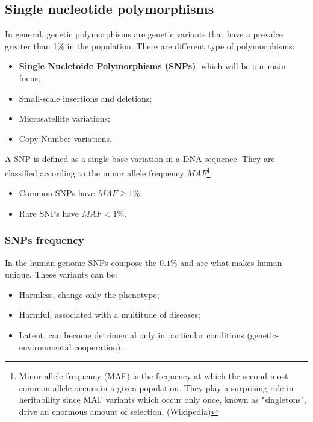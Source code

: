 	\subsection{Single nucleotide polymorphisms}
	In general, genetic polymorphisms are genetic variants that have a prevalce greater than 1\% in the population.
	There are different type of polymorphisms:
	\begin{itemize}
	 \item \textbf{Single Nucletoide Polymorphisms (SNPs)}, which will be our main focus;
	 \item Small-scale insertions and deletions;
	 \item Microsatellite variations;
	 \item Copy Number variations.
	 \end{itemize} 
	 
	A SNP is defined as a single base variation in a DNA sequence.
	They are classified according to the minor allele frequency $MAF$\footnote{Minor allele frequency (MAF) is the frequency at which the second most common allele occurs in a given population. They play a surprising role in heritability since MAF variants which occur only once, known as "singletons", drive an enormous amount of selection. (Wikipedia)}

	\begin{multicols}{2}
		\begin{itemize}
			\item Common SNPs have $MAF \ge 1\%$.
			\item Rare SNPs have $MAF < 1\%$.
		\end{itemize}
	\end{multicols}

		\subsubsection{SNPs frequency}
		In the human genome SNPs compose the $0.1\%$ and are what makes human unique.
		These variants can be:

		\begin{multicols}{3}
			\begin{itemize}
				\item Harmless, change only the phenotype;
				\item Harmful, associated with a multitude of diseases;
				\item Latent, can become detrimental only in particular conditions (genetic-environmental cooperation).
			\end{itemize}
		\end{multicols}

